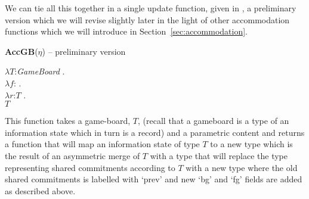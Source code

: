 We can tie all this together in a single update function, given in
\nexteg{}, a preliminary version which we will revise slightly later
in the light of other accommodation functions which we will introduce
in Section~\ref{sec:accommodation}.
\begin{ex} 
\textbf{AccGB}($\eta$) -- preliminary version

$\lambda T$:\textit{GameBoard} . \\
\hspace*{1em} $\lambda
f$:
              . \\
\hspace*{2em} $\lambda r$:$T$ . \\ 
\hspace*{3em} $T$ \fbox{\d{$\wedge$}} 
\label{ex:AccGBprelim} 
\end{ex} 
This function takes a game-board, $T$, (recall that a gameboard is a type of
an information state which in turn is a record) and a parametric
content and returns a function that will map an information state of
type $T$ to a new type which is the result of an asymmetric merge of
$T$ with a type that will replace the type representing shared
commitments according to $T$ with a new type where the old shared
commitments is labelled with `prev'  and new `bg' and `fg' fields are
added as described above.

  


